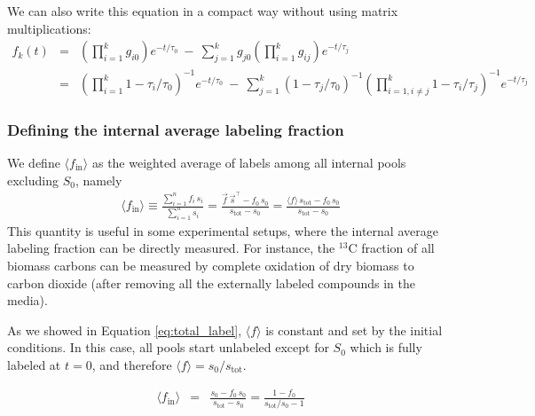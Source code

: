 \documentclass{article}
\newcommand{\favg}{\ensuremath{\langle f \rangle}}
\newcommand{\fin}{\ensuremath{\langle f_{\text{in}} \rangle}}
\newcommand{\stot}{\ensuremath{s_\text{tot}}}
\begin{document}
We can also write this equation in a compact way without using matrix multiplications:
\begin{eqnarray}
    f_k(t) &=& \left(\prod_{i=1}^{k} g_{i0}\right) e^{- t/\tau_0}
    ~-~ \sum_{j=1}^{k} g_{j0} \left(\prod_{i=1}^{k} g_{ij}\right) e^{- t/\tau_j} \\
    &=& 
    \left(\prod_{i=1}^{k} 1 - \tau_i/\tau_0 \right)^{-1} e^{- t/\tau_0}
    ~-~
    \sum_{j=1}^{k} (1-\tau_j/\tau_0)^{-1} \left(\prod_{i = 1, i \neq j}^{k} 1 - \tau_i/\tau_j\right)^{-1} e^{- t/\tau_j}
\end{eqnarray}

\subsubsection{Defining the internal average labeling fraction}

We define $\fin$ as the weighted average of labels among all internal pools excluding $S_0$, namely 
\begin{eqnarray}
	\fin \equiv 
	\frac{\sum_{i=1}^{n} f_i \, s_i}{\sum_{i=1}^{n} s_i} =
	\frac{\vec{f} \, \vec{s}^\top - f_0 \, s_0}{\stot - s_0} = 
	\frac{\favg \, \stot - f_0 \, s_0}{\stot - s_0}
\end{eqnarray}
This quantity is useful in some experimental setups, where the internal average labeling fraction can be directly measured. For instance, the $^{13}$C fraction of all biomass carbons can be measured by complete oxidation of dry biomass to carbon dioxide (after removing all the externally labeled compounds in the media).

As we showed in Equation \ref{eq:total_label}, $\favg$ is constant and set by the initial conditions. In this case, all pools start unlabeled except for $S_0$ which is fully labeled at $t = 0$, and therefore $\favg = s_0 / \stot$.

\begin{eqnarray}
	\fin &=& 
	\frac{s_0 - f_0 \, s_0}{\stot - s_0} = 
	\frac{1 - f_0}{\stot/s_0 - 1} \label{eq:ftot}
\end{eqnarray}
\end{document}
